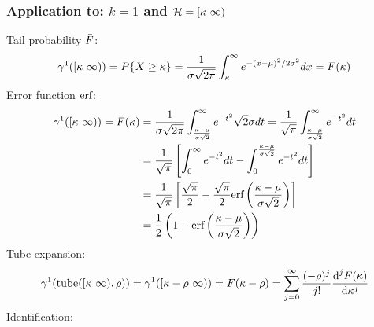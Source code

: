 \documentclass[12pt]{article}
\begin{document}
\subsubsection{Application to: $k=1$ and $\mathcal{H}=[\kappa\ \infty)$}
Tail probability $\bar{F}$:
\begin{equation}
  \gamma^1([\kappa\ \infty)) = P\{X\ge\kappa\}=\frac{1}{\sigma\sqrt{2\pi}} \int_\kappa^\infty e^{-(x-\mu)^2/2\sigma^2} dx=\bar{F}(\kappa)
\end{equation}
Error function $\text{erf}$:
\begin{subequations}
  \begin{align*}
    \gamma^1([\kappa\ \infty)) = \bar{F}(\kappa) & = \frac{1}{\sigma\sqrt{2\pi}} \int_{\frac{\kappa-\mu}{\sigma\sqrt{2}}}^\infty e^{-t^2} \sqrt{2}\sigma dt = \frac{1}{\sqrt{\pi}} \int_{\frac{\kappa-\mu}{\sigma\sqrt{2}}}^\infty e^{-t^2} dt \\
                          & = \frac{1}{\sqrt{\pi}} \left[ \int_0^\infty e^{-t^2} dt - \int_0^{\frac{\kappa-\mu}{\sigma\sqrt{2}}} e^{-t^2} dt \right]\\
                          & = \frac{1}{\sqrt{\pi}} \left[ \frac{\sqrt{\pi}}{2} - \frac{\sqrt{\pi}}{2}\text{erf}\left(\frac{\kappa-\mu}{\sigma \sqrt{2}}\right) \right]\\
                          & = \frac{1}{2}\left(1-\text{erf}\left(\frac{\kappa-\mu}{\sigma\sqrt{2}}\right)\right)
  \end{align*}
\end{subequations}
Tube expansion:
\begin{equation}
  \GaussMeas^1(\tube(\uinf,\ray))=\GaussMeas^1([\lset-\ray\ \infty))=\TP(\lset-\ray)=\sum_{j=0}^{\infty} \frac{(-\ray)^j}{j!} \frac{\text{d}^j \TP(\lset)}{\text{d} \lset^j}
\end{equation}
Identification:
\end{document}
